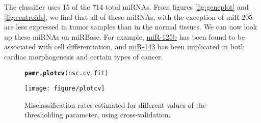 \documentclass[12pt,english]{article}\usepackage{graphicx, color}
\makeatletter
\def\maxwidth{ %
  \ifdim\Gin@nat@width>\linewidth
    \linewidth
  \else
    \Gin@nat@width
  \fi
}
\newcommand{\hlfunctioncall}[1]{\textcolor[rgb]{0.501960784313725,0,0.329411764705882}{\textbf{#1}}}%
\newcommand{\hlstring}[1]{\textcolor[rgb]{0.6,0.6,1}{#1}}%
\newenvironment{kframe}{%
 \def\at@end@of@kframe{}%
 \ifinner\ifhmode%
  \def\at@end@of@kframe{\end{minipage}}%
  \begin{minipage}{\columnwidth}%
 \fi\fi%
 \def\FrameCommand##1{\hskip\@totalleftmargin \hskip-\fboxsep
 \colorbox{shadecolor}{##1}\hskip-\fboxsep
     \hskip-\linewidth \hskip-\@totalleftmargin \hskip\columnwidth}%
 \MakeFramed {\advance\hsize-\width
   \@totalleftmargin\z@ \linewidth\hsize
   \@setminipage}}%
 {\par\unskip\endMakeFramed%
 \at@end@of@kframe}
\newenvironment{knitrout}{}{} %
\numberwithin{equation}{section}
\numberwithin{figure}{section}
\theoremstyle{plain}
\theoremstyle{remark}
\makeatother
\begin{document}
The classifier uses 15 of the 714 total
miRNAs. From figures \ref{fig:geneplot} and \ref{fig:centroids}, we
find that all of these miRNAs, with the exception of miR-205 are less
expressed in tumor samples than in the normal tissues. We can now look up
these miRNAs on miRBase. For example,
\href{http://www.mirbase.org/cgi-bin/mirna_entry.pl?acc=MI0000446}{miR-125b}
has been found to be associated with cell differentiation, and
\href{http://www.mirbase.org/cgi-bin/mirna_entry.pl?acc=MI0000459}{miR-143}
has been implicated in both cardiac morphogenesis and certain types of
cancer.


\begin{spacing}{1}
\begin{figure}
\begin{knitrout}
\color{fgcolor}\begin{kframe}
\begin{alltt}
\hlfunctioncall{pamr.plotcv}(nsc.cv.fit)
\end{alltt}
\end{kframe}
\texttt{[image: figure/plotcv]} 

\end{knitrout}

\caption{Misclassification rates estimated for different values of the
  thresholding parameter, using cross-validation.}
\label{fig:cv}
\end{figure}
\end{spacing}
\end{document}
